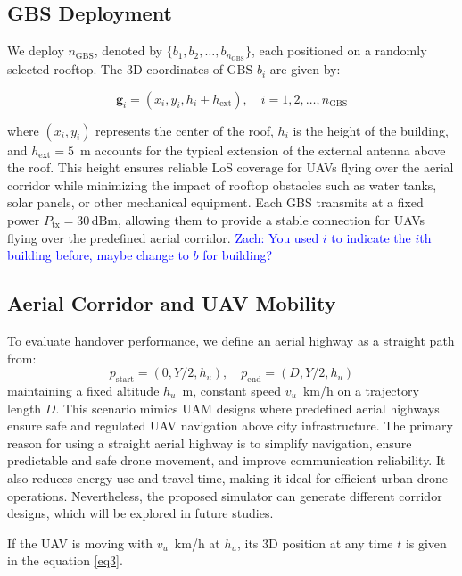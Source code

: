 \documentclass[conference]{IEEEtran}
\newcommand*\zc[1]{\textcolor{blue}{Zach: #1}}
\begin{document}
\subsection{GBS Deployment}

We deploy $n_{\text{GBS}}$, denoted by $\{b_1, b_2, \dots, b_{n_{\text{GBS}}}\}$, each positioned on a randomly selected rooftop. The 3D coordinates of GBS $b_i$ are given by:

\begin{equation}
\mathbf{g}_i = (x_i, y_i, h_i + h_{\text{ext}}), \quad i = 1, 2, \dots, n_{\text{GBS}}
\end{equation}

where $(x_i, y_i)$ represents the center of the roof, $h_i$ is the height of the building, and $h_{\text{ext}} = 5$~m accounts for the typical extension of the external antenna above the roof. This height ensures reliable LoS coverage for UAVs flying over the aerial corridor while minimizing the impact of rooftop obstacles such as water tanks, solar panels, or other mechanical equipment. Each GBS transmits at a fixed power \(P_{\mathrm{tx}} = 30\,\text{dBm}\), allowing them to provide a stable connection for UAVs flying over the predefined aerial corridor. \zc{You used $i$ to indicate the $i$th building before, maybe change to $b$ for building?}

\subsection{Aerial Corridor and UAV Mobility}

To evaluate handover performance, we define an aerial highway as a straight path from: 
\begin{equation*}   
p_{\text{start}} = (0, Y/2, h_u), \quad p_{\text{end}} = (D, Y/2, h_u)
\end{equation*}
maintaining a fixed altitude $h_u$~m, constant speed $v_u$~km/h on a trajectory length $D$. This scenario mimics UAM designs where predefined aerial highways ensure safe and regulated UAV navigation above city infrastructure. The primary reason for using a straight aerial highway is to simplify navigation, ensure predictable and safe drone movement, and improve communication reliability. It also reduces energy use and travel time, making it ideal for efficient urban drone operations. Nevertheless, the proposed simulator can generate different corridor designs, which will be explored in future studies.  

If the UAV is moving with $v_u$~km/h at $h_u$, its 3D position at any time $t$ is given in the equation \eqref{eq3}. 
\end{document}
